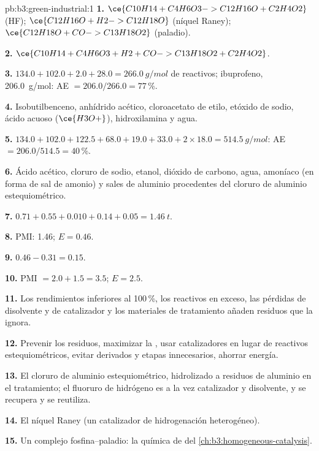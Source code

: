 \begin{solution}{pb:b3:green-industrial:1}
\textbf{1.} $\ce{C10H14 + C4H6O3 -> C12H16O + C2H4O2}$ (HF); $\ce{C12H16O + H2 -> C12H18O}$ (níquel Raney);
$\ce{C12H18O + CO -> C13H18O2}$ (paladio).

\textbf{2.} $\ce{C10H14 + C4H6O3 + H2 + CO -> C13H18O2 + C2H4O2}$.

\textbf{3.} $134.0 + 102.0 + 2.0 + 28.0 = \qty{266.0}{g/mol}$ de reactivos; ibuprofeno, \qty{206.0}{g/mol}: AE $= 206.0/266.0 = 77$\,\%.

\textbf{4.} Isobutilbenceno, anhídrido acético, cloroacetato de etilo, etóxido de sodio,
ácido acuoso ($\ce{H3O+}$), hidroxilamina y agua.

\textbf{5.} $134.0 + 102.0 + 122.5 + 68.0 + 19.0 + 33.0 + 2 \times 18.0 = \qty{514.5}{g/mol}$: AE $= 206.0/514.5 = 40$\,\%.

\textbf{6.} Ácido acético, cloruro de sodio, etanol, dióxido de carbono, agua, amoníaco (en forma de
sal de amonio) y sales de aluminio procedentes del cloruro de aluminio estequiométrico.

\textbf{7.} $0.71 + 0.55 + 0.010 + 0.14 + 0.05 = \qty{1.46}{t}$.

\textbf{8.} PMI: 1.46; $E = 0.46$.

\textbf{9.} $0.46 - 0.31 = 0.15$.

\textbf{10.} PMI $= 2.0 + 1.5 = 3.5$; $E = 2.5$.

\textbf{11.} Los rendimientos inferiores al 100\,\%, los reactivos en exceso, las pérdidas de disolvente y de catalizador y los
materiales de tratamiento añaden residuos que la  ignora.

\textbf{12.} Prevenir los residuos, maximizar la , usar catalizadores en lugar de
reactivos estequiométricos, evitar derivados y etapas innecesarios, ahorrar energía.

\textbf{13.} El cloruro de aluminio estequiométrico, hidrolizado a residuos de aluminio en el
tratamiento; el fluoruro de hidrógeno es a la vez catalizador y disolvente, y se recupera y se reutiliza.

\textbf{14.} El níquel Raney (un catalizador de hidrogenación heterogéneo).

\textbf{15.} Un complejo fosfina--paladio: la química de  del
\cref{ch:b3:homogeneous-catalysis}.


\end{solution}
